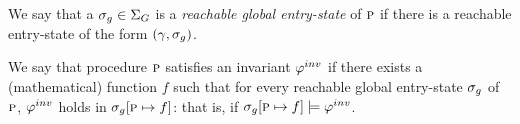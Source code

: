 We say that a $\sigma_g \in \Sigma_G$ is a \emph{reachable global entry-state} of $\textsc{p}$ if
there is a reachable entry-state of the form $(\gamma,\sigma_g)$.

\begin{definition}[Invariant]
We say that procedure $\textsc{p}$ satisfies an invariant $\varphi^{inv}$ if there exists a (mathematical)
function $f$ such that for every reachable global entry-state $\sigma_g$ of $\textsc{p}$,
$\varphi^{inv}$ holds in $\sigma_g[\textsc{p} \mapsto f]$: that is, if $\sigma_g[\textsc{p} \mapsto f] \models \varphi^{inv}$.
\end{definition}